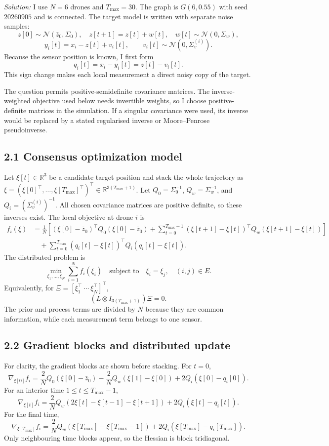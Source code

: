 \documentclass[a4paper,11pt]{article}
\newenvironment{solution}{\textit{Solution:}}{}
\newcommand{\R}{\mathbb{R}}
\begin{document}
\begin{solution}
I use $N=6$ drones and $T_{\max}=30$. The graph is $G(6,0.55)$ with seed $20260905$ and is
connected. The target model is written with separate noise samples:
\[
z[0]\sim\mathcal N(\bar z_0,\Sigma_0),\quad z[t+1]=z[t]+w[t],\quad
w[t]\sim\mathcal N(0,\Sigma_w),
\]
\[
y_i[t]=x_i-z[t]+v_i[t],\qquad v_i[t]\sim\mathcal N(0,\Sigma_v^{(i)}).
\]
Because the sensor position is known, I first form
\[
q_i[t]=x_i-y_i[t]=z[t]-v_i[t].
\]
This sign change makes each local measurement a direct noisy copy of the target.

The question permits positive-semidefinite covariance matrices. The inverse-weighted objective used
below needs invertible weights, so I choose positive-definite matrices in the simulation. If a
singular covariance were used, its inverse would be replaced by a stated regularised inverse or
Moore--Penrose pseudoinverse.

\subsection*{2.1 Consensus optimization model}
Let $\xi[t]\in\R^3$ be a candidate target position and stack the whole trajectory as
$\xi=(\xi[0]^\top,\ldots,\xi[T_{\max}]^\top)^\top\in\R^{3(T_{\max}+1)}$.
Let $Q_0=\Sigma_0^{-1}$, $Q_w=\Sigma_w^{-1}$, and $Q_i=(\Sigma_v^{(i)})^{-1}$.
All chosen covariance matrices are positive definite, so these inverses exist. The local objective
at drone $i$ is
\begin{align*}
f_i(\xi)&=\frac1N\left[(\xi[0]-\bar z_0)^\top Q_0(\xi[0]-\bar z_0)
 +\sum_{t=0}^{T_{\max}-1}(\xi[t+1]-\xi[t])^\top Q_w(\xi[t+1]-\xi[t])\right]\\
&\quad +\sum_{t=0}^{T_{\max}}(q_i[t]-\xi[t])^\top Q_i(q_i[t]-\xi[t]).
\end{align*}
The distributed problem is
\[
\min_{\xi_1,\ldots,\xi_N}\sum_{i=1}^N f_i(\xi_i)
\quad\text{subject to}\quad \xi_i=\xi_j,\quad (i,j)\in E.
\]
Equivalently, for $\Xi=[\xi_1^\top\ \cdots\ \xi_N^\top]^\top$,
\[
(L\otimes I_{3(T_{\max}+1)})\Xi=0.
\]
The prior and process terms are divided by $N$ because they are common information, while each
measurement term belongs to one sensor.

\subsection*{2.2 Gradient blocks and distributed update}
For clarity, the gradient blocks are shown before stacking. For $t=0$,
\[
\nabla_{\xi[0]}f_i=\frac{2}{N}Q_0(\xi[0]-\bar z_0)-\frac{2}{N}Q_w(\xi[1]-\xi[0])
 +2Q_i(\xi[0]-q_i[0]).
\]
For an interior time $1\le t\le T_{\max}-1$,
\[
\nabla_{\xi[t]}f_i=\frac{2}{N}Q_w(2\xi[t]-\xi[t-1]-\xi[t+1])
 +2Q_i(\xi[t]-q_i[t]).
\]
For the final time,
\[
\nabla_{\xi[T_{\max}]}f_i=\frac{2}{N}Q_w(\xi[T_{\max}]-\xi[T_{\max}-1])
 +2Q_i(\xi[T_{\max}]-q_i[T_{\max}]).
\]
Only neighbouring time blocks appear, so the Hessian is block tridiagonal.


\end{solution}
\end{document}
